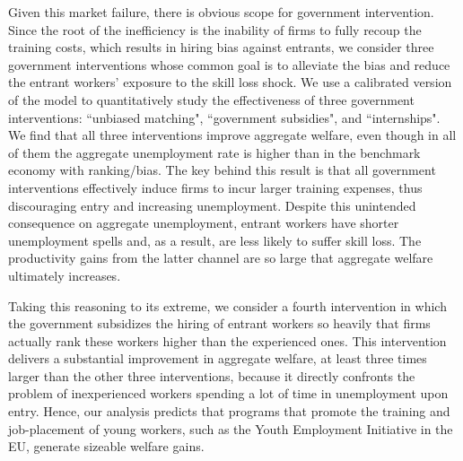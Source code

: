 \documentclass[12pt]{article} %
\theoremstyle{definition}
\begin{document}
 
Given this market failure, there is obvious scope for government intervention. Since the root of the inefficiency is the inability of firms to fully recoup the training costs, which results in hiring bias against entrants, we consider three government interventions whose common goal is to alleviate the bias and reduce the entrant workers' exposure to the skill loss shock. We use a calibrated version of the model to quantitatively study the effectiveness of three government interventions: ``unbiased matching", ``government subsidies", and ``internships". We find that all three interventions improve aggregate welfare, even though in all of them the aggregate unemployment rate is higher than in the benchmark economy with ranking/bias. The key behind this result is that all government interventions effectively induce firms to incur larger training expenses, thus discouraging entry and increasing unemployment. Despite this unintended consequence on aggregate unemployment, entrant workers have shorter unemployment spells and, as a result, are less likely to suffer skill loss. The productivity gains from the latter channel are so large that aggregate welfare ultimately increases. 

Taking this reasoning to its extreme, we consider a fourth intervention in which the government subsidizes the hiring of entrant workers so heavily that firms actually rank these workers higher than the experienced ones. 
This intervention delivers a substantial improvement in aggregate welfare, at least three times larger than the other three interventions, because it directly confronts the problem of inexperienced workers spending a lot of time in unemployment upon entry.
Hence, our analysis predicts that programs that promote the training and job-placement of young workers, such as the Youth Employment Initiative in the EU, generate sizeable welfare gains.


\end{document}
